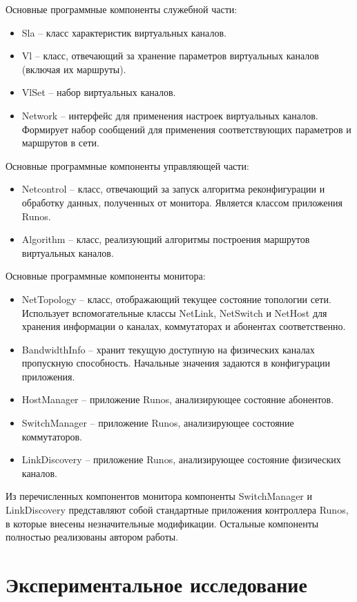 \documentclass[12pt, a4paper]{article}
\begin{document}
Основные программные компоненты служебной части:
\begin{itemize}
	\item Sla -- класс характеристик виртуальных каналов.
	\item Vl -- класс, отвечающий за хранение параметров виртуальных каналов (включая их маршруты).
	\item VlSet -- набор виртуальных каналов.
	\item Network -- интерфейс для применения настроек виртуальных каналов. Формирует набор сообщений для применения соответствующих параметров и маршрутов в сети.
\end{itemize}

Основные программные компоненты управляющей части:
\begin{itemize}
	\item Netcontrol -- класс, отвечающий за запуск алгоритма реконфигурации и обработку данных, полученных от монитора. Является классом приложения Runos.
	\item Algorithm -- класс, реализующий алгоритмы построения маршрутов виртуальных каналов.
\end{itemize}

Основные программные компоненты монитора:
\begin{itemize}
	\item NetTopology -- класс, отображающий текущее состояние топологии сети. Использует вспомогательные классы NetLink, NetSwitch и NetHost для хранения информации о каналах, коммутаторах и абонентах соответственно.
	\item BandwidthInfo -- хранит текущую доступную на физических каналах пропускную способность. Начальные значения задаются в конфигурации приложения.
	\item HostManager -- приложение Runos, анализирующее состояние абонентов.
	\item SwitchManager -- приложение Runos, анализирующее состояние коммутаторов.
	\item LinkDiscovery -- приложение Runos, анализирующее состояние физических каналов.
\end{itemize}

Из перечисленных компонентов монитора компоненты SwitchManager и LinkDiscovery представляют собой стандартные приложения контроллера Runos, в которые внесены незначительные модификации. Остальные компоненты полностью реализованы автором работы. 

\section{Экспериментальное исследование}
\end{document}
